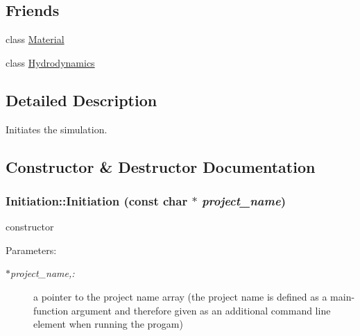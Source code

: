 \subsection*{Friends}
\begin{CompactItemize}
\item 
\hypertarget{classInitiation_a1212b6e372a0f45d2c01f3cd203af77}{
class \hyperlink{classInitiation_a1212b6e372a0f45d2c01f3cd203af77}{Material}}
\label{classInitiation_a1212b6e372a0f45d2c01f3cd203af77}

\item 
\hypertarget{classInitiation_652e6d35f07e2091db6c1d01e86e2286}{
class \hyperlink{classInitiation_652e6d35f07e2091db6c1d01e86e2286}{Hydrodynamics}}
\label{classInitiation_652e6d35f07e2091db6c1d01e86e2286}

\end{CompactItemize}


\subsection{Detailed Description}
Initiates the simulation. 

\subsection{Constructor \& Destructor Documentation}
\hypertarget{classInitiation_4db3b8c45d38cf4e188de6aa672e8c0d}{
\subsubsection[{Initiation}]{\setlength{\rightskip}{0pt plus 5cm}Initiation::Initiation (const char $\ast$ {\em project\_\-name})}}
\label{classInitiation_4db3b8c45d38cf4e188de6aa672e8c0d}


constructor \begin{Desc}
\item[Parameters:]
\begin{description}
\item[{\em $\ast$project\_\-name,:}]a pointer to the project name array (the project name is defined as a main-function argument and therefore given as an additional command line element when running the progam) \end{description}
\end{Desc}


